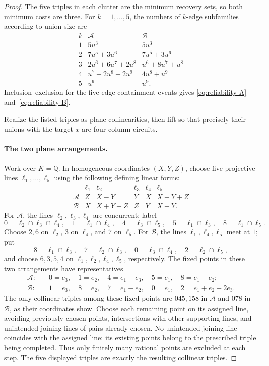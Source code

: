 \begin{proof}
The five triples in each clutter are the minimum recovery sets, so both
minimum costs are three.  For $k=1,\ldots,5$, the numbers of $k$-edge
subfamilies according to union size are
\[
\begin{array}{c|c|c}
k&\mathcal A&\mathcal B\\ \hline
1&5u^3&5u^3\\
2&7u^5+3u^6&7u^5+3u^6\\
3&2u^6+6u^7+2u^8&u^6+8u^7+u^8\\
4&u^7+2u^8+2u^9&4u^8+u^9\\
5&u^9&u^9.
\end{array}
\]
Inclusion--exclusion for the five edge-containment events gives
\eqref{eq:reliability-A} and~\eqref{eq:reliability-B}.

Realize the listed triples as plane collinearities, then lift so that precisely
their unions with the target $x$ are four-column circuits.

\paragraph{The two plane arrangements.}
Work over $K=\mathbb Q$.  In homogeneous coordinates $(X,Y,Z)$, choose
five projective lines $\ell_1,\ldots,\ell_5$ using the following defining
linear forms:
\[
\begin{array}{c|ccccc}
 & \ell_1&\ell_2&\ell_3&\ell_4&\ell_5\\ \hline
\mathcal A&Z&X-Y&Y&X&X+Y+Z\\
\mathcal B&X&X+Y+Z&Z&Y&X-Y.
\end{array}
\]
For $\mathcal A$, the lines $\ell_2,\ell_3,\ell_4$ are concurrent; label
\[
 0=\ell_2\cap\ell_3\cap\ell_4,\quad
 1=\ell_1\cap\ell_4,\quad
 4=\ell_3\cap\ell_5,\quad
 5=\ell_1\cap\ell_3,\quad
 8=\ell_1\cap\ell_5.
\]
Choose $2,6$ on $\ell_2$, $3$ on $\ell_4$, and $7$ on $\ell_5$.
For $\mathcal B$, the lines $\ell_1,\ell_4,\ell_5$ meet at $1$; put
\[
 8=\ell_1\cap\ell_3,\quad
 7=\ell_2\cap\ell_3,\quad
 0=\ell_3\cap\ell_4,\quad
 2=\ell_2\cap\ell_5,
\]
and choose $6,3,5,4$ on $\ell_1,\ell_2,\ell_4,\ell_5$, respectively.
The fixed points in these two arrangements have representatives
\[
\begin{aligned}
\mathcal A:\quad&0=e_3,\quad1=e_2,\quad4=e_1-e_3,\quad
                  5=e_1,\quad8=e_1-e_2;\\
\mathcal B:\quad&1=e_3,\quad8=e_2,\quad7=e_1-e_2,\quad
                  0=e_1,\quad2=e_1+e_2-2e_3.
\end{aligned}
\]
The only collinear triples among these fixed points are $045,158$ in
$\mathcal A$ and $078$ in $\mathcal B$, as their coordinates show.
Choose each remaining point on its assigned line, avoiding previously chosen
points, intersections with other supporting lines, and unintended joining
lines of pairs already chosen.  No unintended joining line coincides with the
assigned line: its existing points belong to the prescribed triple being
completed.  Thus only finitely many rational points are excluded at each
step.  The five displayed triples are exactly the resulting collinear triples.


\end{proof}
